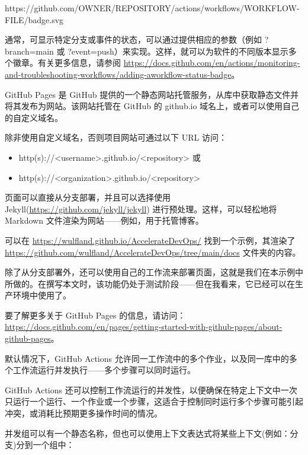 \begin{shell}
https://github.com/OWNER/REPOSITORY/actions/workflows/WORKFLOW-FILE/badge.svg
\end{shell}

通常，可显示特定分支或事件的状态，可以通过提供相应的参数（例如 ?branch=main 或 ?event=push）来实现。这样，就可以为软件的不同版本显示多个徽章。有关更多信息，请参阅 \url{ https://docs.github.com/en/actions/monitoring-and-troubleshooting-workflows/adding-aworkflow-status-badge}。


GitHub Pages 是 GitHub 提供的一个静态网站托管服务，从库中获取静态文件并将其发布为网站。该网站托管在 GitHub 的 github.io 域名上，或者可以使用自己的自定义域名。

除非使用自定义域名，否则项目网站可通过以下 URL 访问：

\begin{itemize}
\item 
http(s)://<username>.github.io/<repository> 或

\item 
http(s)://<organization>.github.io/<repository>
\end{itemize}

页面可以直接从分支部署，并且可以选择使用 Jekyll(\url{https://github.com/jekyll/jekyll}) 进行预处理。这样，可以轻松地将 Markdown 文件渲染为网站——例如，用于托管博客。

可以在 \url{https://wulfland.github.io/AccelerateDevOps/} 找到一个示例，其渲染了 \url{https://github.com/wulfland/AccelerateDevOps/tree/main/docs} 文件夹的内容。

除了从分支部署外，还可以使用自己的工作流来部署页面，这就是我们在本示例中所做的。在撰写本文时，该功能仍处于测试阶段——但在我看来，它已经可以在生产环境中使用了。

要了解更多关于 GitHub Pages 的信息，请访问：\url{https://docs.github.com/en/pages/getting-started-with-github-pages/about-github-pages}。


默认情况下，GitHub Actions 允许同一工作流中的多个作业，以及同一库中的多个工作流运行并发执行——多个步骤可以同时运行。

GitHub Actions 还可以控制工作流运行的并发性，以便确保在特定上下文中一次只运行一个运行、一个作业或一个步骤，这适合于控制同时运行多个步骤可能引起冲突，或消耗比预期更多操作时间的情况。

并发组可以有一个静态名称，但也可以使用上下文表达式将某些上下文(例如：分支)分到一个组中：

